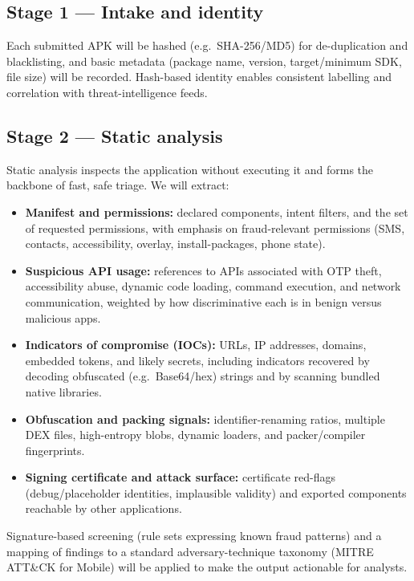 \documentclass[11pt,a4paper]{article}
\begin{document}
\subsection{Stage 1 --- Intake and identity}
Each submitted APK will be hashed (e.g.\ SHA-256/MD5) for de-duplication and blacklisting,
and basic metadata (package name, version, target/minimum SDK, file size) will be
recorded. Hash-based identity enables consistent labelling and correlation with
threat-intelligence feeds.

\subsection{Stage 2 --- Static analysis}
Static analysis inspects the application without executing it and forms the backbone of
fast, safe triage. We will extract:
\begin{itemize}
    \item \textbf{Manifest and permissions:} declared components, intent filters, and the set of requested permissions, with emphasis on fraud-relevant permissions (SMS, contacts, accessibility, overlay, install-packages, phone state).
    \item \textbf{Suspicious API usage:} references to APIs associated with OTP theft, accessibility abuse, dynamic code loading, command execution, and network communication, weighted by how discriminative each is in benign versus malicious apps.
    \item \textbf{Indicators of compromise (IOCs):} URLs, IP addresses, domains, embedded tokens, and likely secrets, including indicators recovered by decoding obfuscated (e.g.\ Base64/hex) strings and by scanning bundled native libraries.
    \item \textbf{Obfuscation and packing signals:} identifier-renaming ratios, multiple DEX files, high-entropy blobs, dynamic loaders, and packer/compiler fingerprints.
    \item \textbf{Signing certificate and attack surface:} certificate red-flags (debug/placeholder identities, implausible validity) and exported components reachable by other applications.
\end{itemize}
Signature-based screening (rule sets expressing known fraud patterns) and a mapping of
findings to a standard adversary-technique taxonomy (MITRE ATT\&CK for Mobile) will be
applied to make the output actionable for analysts.
\end{document}
